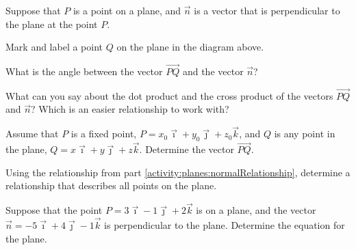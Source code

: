 \begin{problem}
\item Suppose that $P$ is a point on a plane, and $\vec{n}$ is a vector that is perpendicular to the plane at the point $P$.


  \begin{subproblem}
    \item Mark and label a point $Q$ on the plane in the diagram above.
    \item What is the angle between the vector $\vec{PQ}$ and the vector $\vec{n}$?
      \vspace{3em}
    \item What can you say about the dot product and the cross product of the vectors $\vec{PQ}$ and $\vec{n}$? Which is an easier relationship to work with?
      \label{activity:planes:normalRelationship}
      \vfill

      \clearpage

    \item Assume that $P$ is a fixed point, $P=x_0\vec{\imath}+y_0\vec{\jmath}+z_0\vec{k}$, and $Q$ is any point in the plane, $Q=x\vec{\imath}+y\vec{\jmath}+z\vec{k}$.
      Determine the vector $\vec{PQ}$.
        \vfill
    \item Using the relationship from part \ref{activity:planes:normalRelationship}, determine a relationship that describes all points on the plane.
      \vfill
    \item Suppose that the point $P=3\vec{\imath}-1\vec{\jmath}+2\vec{k}$ is on a plane, and the vector $\vec{n}=-5\vec{\imath}+4\vec{\jmath}-1\vec{k}$ is perpendicular to the plane.
       Determine the equation for the plane.
       \vfill
       \vfill
  \end{subproblem}
\end{problem}


